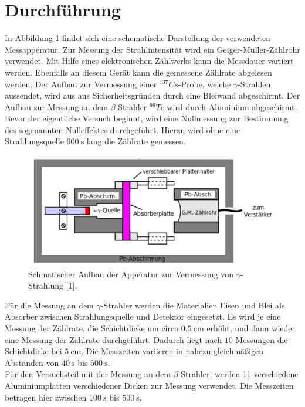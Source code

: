 \section{Durchführung}
\label{sec:Durchführung}

In Abbildung \ref{fig:aufbau} findet sich eine schematische Darstellung der verwendeten 
Messapperatur. Zur Messung der Strahlintensität wird ein Geiger-Müller-Zählrohr
verwendet. Mit Hilfe eines elektronischen Zählwerks kann die Messdauer variiert
werden. Ebenfalls an diesem Gerät kann die gemessene Zählrate abgelesen werden. 
Der Aufbau zur Vermessung einer $^{137}Cs$-Probe, welche $\gamma$-Strahlen 
aussendet, wird aus aus Sicherheitsgründen durch eine Bleiwand abgeschirmt. Der 
Aufbau zur Messung an dem $\beta$-Strahler $^{99}Tc$ wird durch Aluminium 
abgeschirmt. Bevor der eigentliche Versuch beginnt, wird eine Nullmessung zur 
Bestimmung des sogenannten Nulleffektes durchgeführt. Hierzu wird ohne 
eine Strahlungsquelle $\SI{900}{\second}$ lang die Zählrate gemessen.\\

\begin{figure}
  \centering
  \includegraphics[scale=0.15]{content/Aufbau.jpg}
  \caption{Schmatischer Aufbau der Apperatur zur Vermessung von $\gamma$-Strahlung [1].}
  \label{fig:aufbau}
\end{figure}

Für die Messung an dem $\gamma$-Strahler werden die Materialien Eisen und Blei
als Absorber zwischen Strahlungsquelle und Detektor eingesetzt. Es wird je eine
Messung der Zählrate, die Schichtdicke um circa $\SI{0.5}{\centi\meter}$ erhöht,
und dann wieder eine Messung der Zählrate durchgeführt. Dadurch liegt nach $\num{10}$
Messungen die Schichtdicke bei $\SI{5}{\centi\meter}$. Die Messzeiten
variieren in nahezu gleichmäßigen Abständen von $\SI{40}{\second}$ bis $\SI{500}{\second}$.\\
Für den Versuchsteil mit der Messung an dem $\beta$-Strahler, werden 11 verschiedene 
Aluminiumplatten verschiedener Dicken zur Messung verwendet. Die Messzeiten 
betragen hier zwischen $\SI{100}{\second}$ bis $\SI{500}{\second}$.